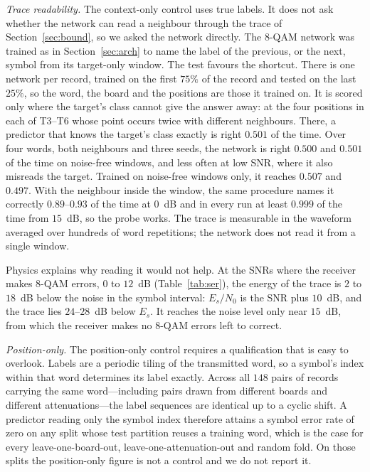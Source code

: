 \documentclass{ieeeaccess}
\begin{document}
\emph{Trace readability.} The context-only control uses true labels. It does
not ask whether the network can read a neighbour through the trace of
Section~\ref{sec:bound}, so we asked the network directly. The 8-QAM network
was trained as in Section~\ref{sec:arch} to name the label of the previous, or
the next, symbol from its target-only window. The test favours the shortcut.
There is one network per record, trained on the first $75\%$ of the record and
tested on the last $25\%$, so the word, the board and the positions are those
it trained on. It is scored only where the target's class cannot give the
answer away: at the four positions in each of T3--T6 whose point occurs twice
with different neighbours. There, a predictor that knows the target's class
exactly is right $0.501$ of the time. Over four words, both neighbours and
three seeds, the network is right $0.500$ and $0.501$ of the time on
noise-free windows, and less often at low SNR, where it also misreads the
target. Trained on noise-free windows only, it reaches $0.507$ and $0.497$.
With the neighbour inside the window, the same procedure names it correctly
$0.89$--$0.93$ of the time at $0$~dB and in every run at least $0.999$ of the
time from $15$~dB, so the probe works. The trace is measurable in the waveform averaged over hundreds of word
repetitions; the network does not read it from a single window.

Physics explains why reading it would not help. At the SNRs where the receiver
makes 8-QAM errors, $0$ to $12$~dB (Table~\ref{tab:ser}), the energy of the
trace is $2$ to $18$~dB below the noise in the symbol interval: $E_s/N_0$ is
the SNR plus $10$~dB, and the trace lies $24$--$28$~dB below $E_s$. It reaches
the noise level only near $15$~dB, from which the receiver makes no 8-QAM
errors left to correct.

\emph{Position-only.} The position-only control requires a qualification that is easy to overlook. Labels are
a periodic tiling of the transmitted word, so a symbol's index within that word
determines its label exactly. Across all $148$ pairs of records carrying the same
word---including pairs drawn from different boards and different
attenuations---the label sequences are identical up to a cyclic shift. A
predictor reading only the symbol index therefore attains a symbol error rate of
zero on any split whose test partition reuses a training word, which is the case
for every leave-one-board-out, leave-one-attenuation-out and random fold. On
those splits the position-only figure is not a control and we do not report it.
\end{document}
